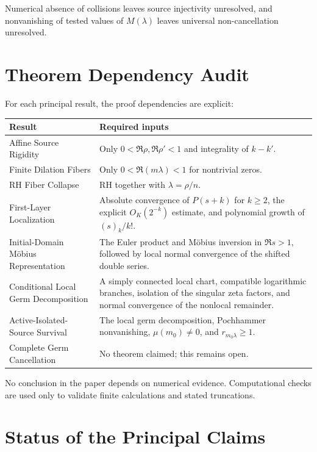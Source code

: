 \documentclass[11pt]{article}
\theoremstyle{definition}
\begin{document}
Numerical absence of collisions leaves source injectivity unresolved, and nonvanishing of tested values of $M(\lambda)$ leaves universal non-cancellation unresolved.

\section{Theorem Dependency Audit}

For each principal result, the proof dependencies are explicit:

\begin{center}
\begin{tabular}{p{}p{}}
\toprule
Result & Required inputs \\
\midrule
Affine Source Rigidity & Only $0<\Re\rho,\Re\rho'<1$ and integrality of $k-k'$. \\
Finite Dilation Fibers & Only $0<\Re(m\lambda)<1$ for nontrivial zeros. \\
RH Fiber Collapse & RH together with $\lambda=\rho/n$. \\
First-Layer Localization & Absolute convergence of $P(s+k)$ for $k\ge2$, the explicit $O_K(2^{-k})$ estimate, and polynomial growth of $(s)_k/k!$. \\
Initial-Domain Möbius Representation & The Euler product and Möbius inversion in $\Re s>1$, followed by local normal convergence of the shifted double series. \\
Conditional Local Germ Decomposition & A simply connected local chart, compatible logarithmic branches, isolation of the singular zeta factors, and normal convergence of the nonlocal remainder. \\
Active-Isolated-Source Survival & The local germ decomposition, Pochhammer nonvanishing, $\mu(m_0)\ne0$, and $r_{m_0\lambda}\ge1$. \\
Complete Germ Cancellation & No theorem claimed; this remains open. \\
\bottomrule
\end{tabular}
\end{center}

No conclusion in the paper depends on numerical evidence. Computational checks are used only to validate finite calculations and stated truncations.

\section{Status of the Principal Claims}
\end{document}
